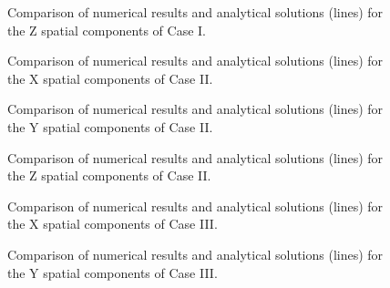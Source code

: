 \begin{figure}[H]
    \centering
    \caption{Comparison of numerical results and analytical solutions (lines) for the Z spatial components of Case I.}
    \label{Fig_NUM_SCHEME_CASE_1Z}
\end{figure}

\begin{figure}[H]
    \centering
    \caption{Comparison of numerical results and analytical solutions (lines) for the X spatial components of Case II.}
    \label{Fig_NUM_SCHEME_CASE_2X}
\end{figure}

\begin{figure}[H]
    \centering
    \caption{Comparison of numerical results and analytical solutions (lines) for the Y spatial components of Case II.}
    \label{Fig_NUM_SCHEME_CASE_2Y}
\end{figure}

\begin{figure}[H]
    \centering
    \caption{Comparison of numerical results and analytical solutions (lines) for the Z spatial components of Case II.}
    \label{Fig_NUM_SCHEME_CASE_2Z}
\end{figure}

\begin{figure}[H]
    \centering
    \caption{Comparison of numerical results and analytical solutions (lines) for the X spatial components of Case III.}
    \label{Fig_NUM_SCHEME_CASE_3X}
\end{figure}

\begin{figure}[H]
    \centering
    \caption{Comparison of numerical results and analytical solutions (lines) for the Y spatial components of Case III.}
    \label{Fig_NUM_SCHEME_CASE_3Y}
\end{figure}

